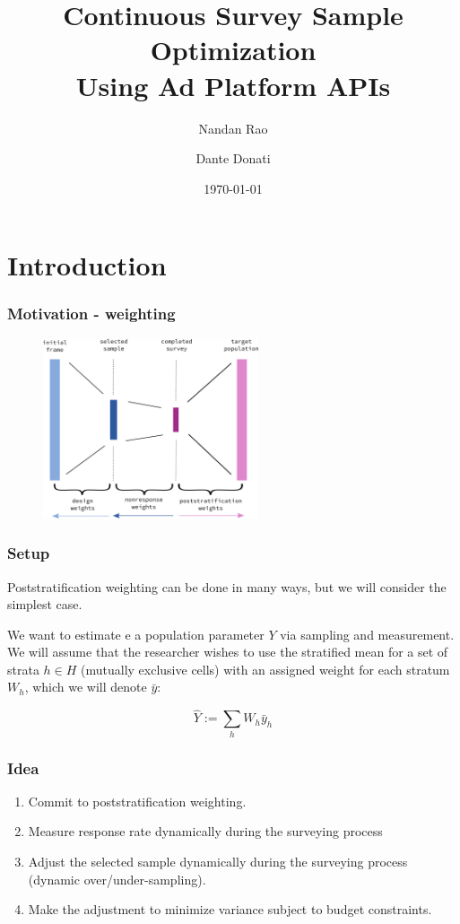\documentclass[aspectratio=169]{beamer}
\title[Continuous Survey Sample Optimization]{Continuous Survey Sample Optimization \\ Using Ad Platform APIs} %
\author[Nandan Rao]{Nandan Rao \inst{1} \and Dante Donati \inst{2}}
\institute[Virtual Lab]{\inst{1} Virtual Lab and UAB \and \inst{2} Columbia University}
\date[\today] {\today} %
\begin{document}
\begin{frame}
\titlepage %
\end{frame}



\section{Introduction}
\begin{frame}
\frametitle{Motivation - weighting}

\begin{figure}[H]
\includegraphics[height=200px]{Figures/weighting.png}
\end{figure}
\end{frame}

\begin{frame}
\frametitle{Setup}

Poststratification weighting can be done in many ways, but we will consider the simplest case.

We want to estimate e a population parameter $Y$ via sampling and measurement. We will assume that the researcher wishes to use the stratified mean for a set of strata $h \in H$ (mutually exclusive cells) with an assigned weight for each stratum $W_h$, which we will denote $\bar{y}$:


$$
\hat{Y} := \sum_h W_h\bar{y}_h
$$

\end{frame}

\begin{frame}
\frametitle{Idea}


\begin{enumerate}

\item Commit to poststratification weighting.

\item Measure response rate dynamically during the surveying process

\item Adjust the selected sample dynamically during the surveying process (dynamic over/under-sampling).

\item Make the adjustment to minimize variance subject to budget constraints.


\end{enumerate}



\end{frame}
\end{document}
